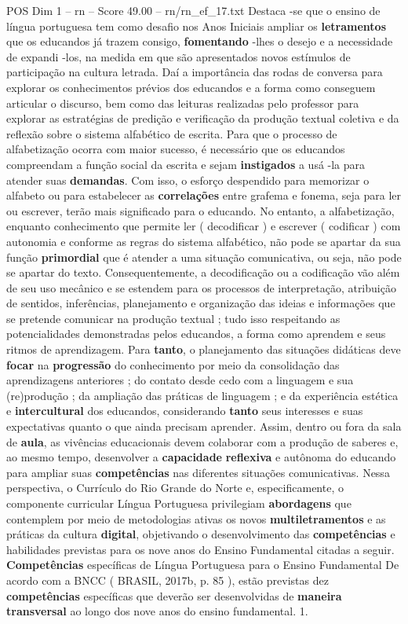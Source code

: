 \begin{textsample}{POS Dim 1 – rn – Score 49.00 – rn/rn\_ef\_17.txt}
Destaca -se que o ensino de língua portuguesa tem como desafio nos Anos Iniciais ampliar os \textbf{letramentos} que os educandos já trazem consigo, \textbf{fomentando} -lhes o desejo e a necessidade de expandi -los, na medida em que são apresentados novos estímulos de participação na cultura letrada.
Daí a importância das rodas de conversa para explorar os conhecimentos prévios dos educandos e a forma como conseguem articular o discurso, bem como das leituras realizadas pelo professor para explorar as estratégias de predição e verificação da produção textual coletiva e da reflexão sobre o sistema alfabético de escrita.
Para que o processo de alfabetização ocorra com maior sucesso, é necessário que os educandos compreendam a função social da escrita e sejam \textbf{instigados} a usá -la para atender suas \textbf{demandas}.
Com isso, o esforço despendido para memorizar o alfabeto ou para estabelecer as \textbf{correlações} entre grafema e fonema, seja para ler ou escrever, terão mais significado para o educando.
No entanto, a alfabetização, enquanto conhecimento que permite ler ( decodificar ) e escrever ( codificar ) com autonomia e conforme as regras do sistema alfabético, não pode se apartar da sua função \textbf{primordial} que é atender a uma situação comunicativa, ou seja, não pode se apartar do texto.
Consequentemente, a decodificação ou a codificação vão além de seu uso mecânico e se estendem para os processos de interpretação, atribuição de sentidos, inferências, planejamento e organização das ideias e informações que se pretende comunicar na produção textual ; tudo isso respeitando as potencialidades demonstradas pelos educandos, a forma como aprendem e seus ritmos de aprendizagem.
Para \textbf{tanto}, o planejamento das situações didáticas deve \textbf{focar} na \textbf{progressão} do conhecimento por meio da consolidação das aprendizagens anteriores ; do contato desde cedo com a linguagem e sua (re)produção ; da ampliação das práticas de linguagem ; e da experiência estética e \textbf{intercultural} dos educandos, considerando \textbf{tanto} seus interesses e suas expectativas quanto o que ainda precisam aprender.
Assim, dentro ou fora da sala de \textbf{aula}, as vivências educacionais devem colaborar com a produção de saberes e, ao mesmo tempo, desenvolver a \textbf{capacidade} \textbf{reflexiva} e autônoma do educando para ampliar suas \textbf{competências} nas diferentes situações comunicativas.
Nessa perspectiva, o Currículo do Rio Grande do Norte e, especificamente, o componente curricular Língua Portuguesa privilegiam \textbf{abordagens} que contemplem por meio de metodologias ativas os novos \textbf{multiletramentos} e as práticas da cultura \textbf{digital}, objetivando o desenvolvimento das \textbf{competências} e habilidades previstas para os nove anos do Ensino Fundamental citadas a seguir. \textbf{Competências} específicas de Língua Portuguesa para o Ensino Fundamental De acordo com a BNCC ( BRASIL, 2017b, p. 85 ), estão previstas dez \textbf{competências} específicas que deverão ser desenvolvidas de \textbf{maneira} \textbf{transversal} ao longo dos nove anos do ensino fundamental. 1.

\end{textsample}
